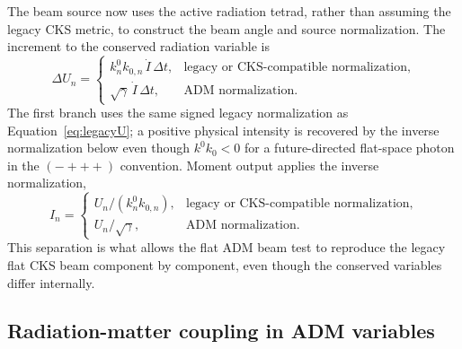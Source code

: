 \documentclass[11pt]{article}
\newcommand{\I}{I}
\begin{document}
The beam source now uses the active radiation tetrad, rather than assuming the
legacy CKS metric, to construct the beam angle and source normalization.  The
increment to the conserved radiation variable is
\begin{equation}
  \Delta U_n =
  \begin{cases}
    k^0_n k_{0,n}\,\dot{\I}\,\Delta t,
       & \text{legacy or CKS-compatible normalization},\\
    \sqrt{\gamma}\,\dot{\I}\,\Delta t,
       & \text{ADM normalization}.
  \end{cases}
  \label{eq:beam_source}
\end{equation}
The first branch uses the same signed legacy normalization as
Equation~\eqref{eq:legacyU}; a positive physical intensity is recovered by the
inverse normalization below even though \(k^0k_0<0\) for a future-directed
flat-space photon in the \((-+++)\) convention.
Moment output applies the inverse normalization,
\begin{equation}
  \I_n =
  \begin{cases}
    U_n/(k^0_n k_{0,n}),
       & \text{legacy or CKS-compatible normalization},\\
    U_n/\sqrt{\gamma},
       & \text{ADM normalization}.
  \end{cases}
  \label{eq:output_norm}
\end{equation}
This separation is what allows the flat ADM beam test to reproduce the legacy
flat CKS beam component by component, even though the conserved variables differ
internally.

\subsection{Radiation-matter coupling in ADM variables}
\end{document}
